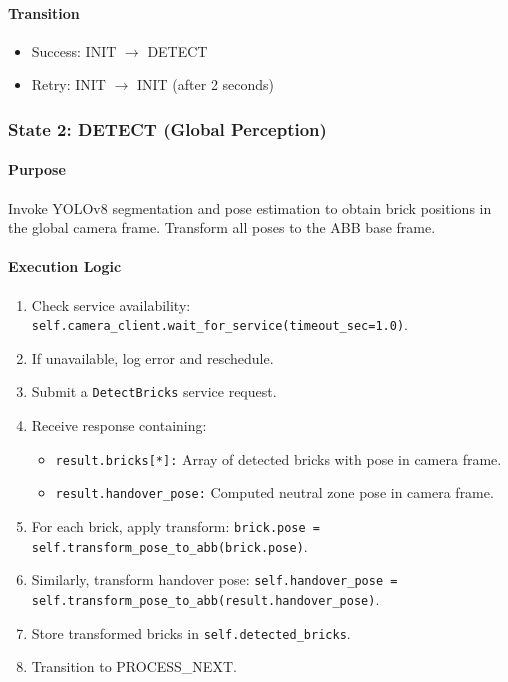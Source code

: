 \paragraph{Transition}

\begin{itemize}
    \item Success: INIT $\rightarrow$ DETECT
    \item Retry: INIT $\rightarrow$ INIT (after 2 seconds)
\end{itemize}

\subsubsection{State 2: DETECT (Global Perception)}
\label{state:detect}

\paragraph{Purpose}

Invoke YOLOv8 segmentation and pose estimation to obtain brick positions in the global camera frame. Transform all poses to the ABB base frame.

\paragraph{Execution Logic}

\begin{enumerate}
    \item Check service availability: \texttt{self.camera\_client.wait\_for\_service(timeout\_sec=1.0)}.
    \item If unavailable, log error and reschedule.
    \item Submit a \texttt{DetectBricks} service request.
    \item Receive response containing:
    \begin{itemize}
        \item \texttt{result.bricks[*]:} Array of detected bricks with pose in camera frame.
        \item \texttt{result.handover\_pose:} Computed neutral zone pose in camera frame.
    \end{itemize}
    \item For each brick, apply transform: \texttt{brick.pose = self.transform\_pose\_to\_abb(brick.pose)}.
    \item Similarly, transform handover pose: \texttt{self.handover\_pose = self.transform\_pose\_to\_abb(result.handover\_pose)}.
    \item Store transformed bricks in \texttt{self.detected\_bricks}.
    \item Transition to PROCESS\_NEXT.
\end{enumerate}


